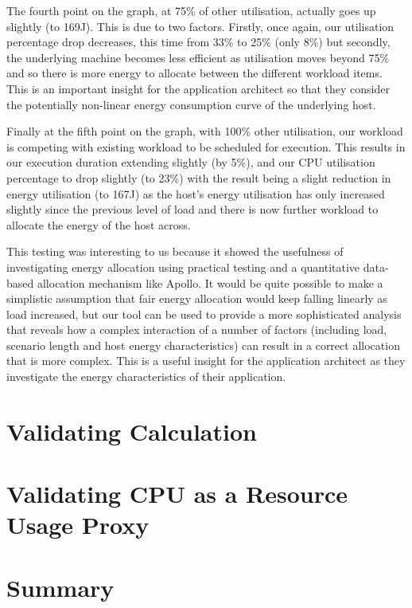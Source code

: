 The fourth point on the graph, at 75\% of other utilisation, actually goes up slightly (to 169J).  This is due to two factors.  Firstly, once again, our utilisation percentage drop decreases, this time from 33\% to 25\% (only 8\%) but secondly, the underlying machine becomes less efficient as utilisation moves beyond 75\% and so there is more energy to allocate between the different workload items.  This is an important insight for the application architect so that they consider the potentially non-linear energy consumption curve of the underlying host.

Finally at the fifth point on the graph, with 100\% other utilisation, our workload is competing with existing workload to be scheduled for execution.  This results in our execution duration extending slightly (by 5\%), and our CPU utilisation percentage to drop slightly (to 23\%) with the result being a slight reduction in energy utilisation (to 167J) as the host's energy utilisation has only increased slightly since the previous level of load and there is now further workload to allocate the energy of the host across.

This testing was interesting to us because it showed the usefulness of investigating energy allocation using practical testing and a quantitative data-based allocation mechanism like Apollo.  It would be quite possible to make a simplistic assumption that fair energy allocation would keep falling linearly as load increased, but our tool can be used to provide a more sophisticated analysis that reveals how a complex interaction of a number of factors (including load, scenario length and host energy characteristics) can result in a correct allocation that is more complex.  This is a useful insight for the application architect as they investigate the energy characteristics of their application.

\section{Validating Calculation}

\section{Validating CPU as a Resource Usage Proxy}

\section{Summary}

